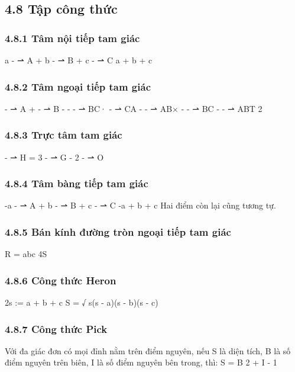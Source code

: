 \documentclass[11pt]{article}
\begin{document}
\subsection{4.8 Tập công thức}
\subsubsection{4.8.1 Tâm nội tiếp tam giác}
\begin{NoteBlock}
a
-
⇀
A + b
-
⇀
B + c
-
⇀
C
a + b + c
\end{NoteBlock}
\subsubsection{4.8.2 Tâm ngoại tiếp tam giác}
\begin{NoteBlock}
-
⇀
A +
-
⇀
B -
-
-
⇀
BC·
-
⇀
CA
-
-
⇀
AB×
-
-
⇀
BC
-
-
⇀
ABT
2
\end{NoteBlock}
\subsubsection{4.8.3 Trực tâm tam giác}
\begin{NoteBlock}
-
⇀
H = 3
-
⇀
G - 2
-
⇀
O
\end{NoteBlock}
\subsubsection{4.8.4 Tâm bàng tiếp tam giác}
\begin{NoteBlock}
-a
-
⇀
A + b
-
⇀
B + c
-
⇀
C
-a + b + c
Hai điểm còn lại cũng tương tự.
\end{NoteBlock}
\subsubsection{4.8.5 Bán kính đường tròn ngoại tiếp tam giác}
\begin{NoteBlock}
R =
abc
4S
\end{NoteBlock}
\subsubsection{4.8.6 Công thức Heron}
\begin{NoteBlock}
2s := a + b + c
S =
√
s(s - a)(s - b)(s - c)
\end{NoteBlock}
\subsubsection{4.8.7 Công thức Pick}
\begin{NoteBlock}
Với đa giác đơn có mọi đỉnh nằm trên điểm nguyên, nếu S là diện tích, B là số điểm nguyên trên biên, I là số điểm nguyên bên trong, thì:
S =
B
2
+ I - 1
\end{NoteBlock}
\end{document}
